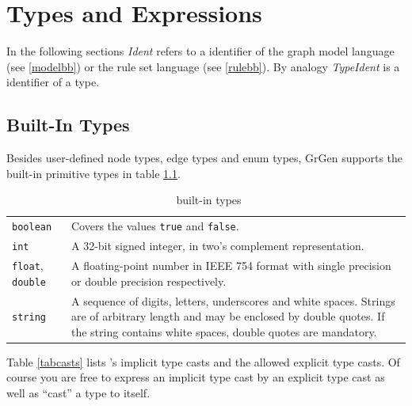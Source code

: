 \chapter{Types and Expressions}
\label{typeexpr}

In the following sections \emph{Ident} refers to a identifier of the graph model language (see \ref{modelbb}) or the rule set language (see \ref{rulebb}). By analogy \emph{TypeIdent} is a identifier of a type.

\section{Built-In Types}
\label{builtin}
Besides user-defined node types, edge types and enum types, GrGen supports the built-in primitive types in table \ref{builtintypes}.
\begin{table}[htbp]
\begin{tabularx}{\linewidth}{|l|X|}\hline
	\texttt{boolean} & Covers the values \texttt{true} and \texttt{false}. \\
	\texttt{int} & A 32-bit signed integer, in two's complement representation. \\
	\texttt{float}, \texttt{double} & A floating-point number in IEEE 754 format with single precision or double precision respectively. \\
	\texttt{string} & A sequence of digits, letters, underscores and white spaces. Strings are of arbitrary length and may be enclosed by double quotes. If the string contains white spaces, double quotes are mandatory.\\ \hline
\end{tabularx}
\caption{\GrG\ built-in types}
\label{builtintypes}
\end{table}
Table \ref{tabcasts} lists \GrG's implicit type casts and the allowed explicit type casts. Of course you are free to express an implicit type cast by an explicit type cast as well as ``cast'' a type to itself.
